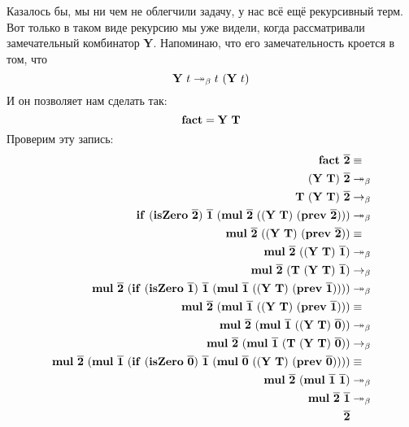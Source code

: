 \documentclass[lambda.tex]{subfiles}
\begin{document}
Казалось бы, мы ни чем не облегчили задачу, у нас всё ещё рекурсивный терм.
Вот только в таком виде рекурсию мы уже видели, когда рассматривали замечательный комбинатор \textbf{Y}.
Напоминаю, что его замечательность кроется в том, что
\[\text{\textbf{Y}}\ t \twoheadrightarrow_\beta t\ (\text{\textbf{Y}}\ t)\]
И он позволяет нам сделать так:
\[\text{\textbf{fact}} = \text{\textbf{Y}}\ \text{\textbf{T}}\]
Проверим эту запись:
\begin{align*}
	\mmterm{fact}\ \mmchurchn{2} &\equiv\\
	(\mmterm{Y}\ \mmterm{T})\ \mmchurchn{2} &\rbm\\
	\mmterm{T}\ (\mmterm{Y}\ \mmterm{T})\ \mmchurchn{2} &\rb\\
	\mmif\ (\mmterm{isZero}\ \mmchurchn{2})\ \mmchurchn{1}\ (\mmterm{mul}\ \mmchurchn{2}\ ((\mmterm{Y}\ \mmterm{T})\ (\mmterm{prev}\ \mmchurchn{2}))) &\rbm\\
	\mmterm{mul}\ \mmchurchn{2}\ ((\mmterm{Y}\ \mmterm{T})\ (\mmterm{prev}\ \mmchurchn{2})) &\equiv\\
	\mmterm{mul}\ \mmchurchn{2}\ ((\mmterm{Y}\ \mmterm{T})\ \mmchurchn{1}) &\rbm\\
	\mmterm{mul}\ \mmchurchn{2}\ (\mmterm{T}\ (\mmterm{Y}\ \mmterm{T})\ \mmchurchn{1}) &\rb\\
	\mmterm{mul}\ \mmchurchn{2}\ (\mmif\ (\mmterm{isZero}\ \mmchurchn{1})\ \mmchurchn{1}\ (\mmterm{mul}\ \mmchurchn{1}\ ((\mmterm{Y}\ \mmterm{T})\ (\mmterm{prev}\ \mmchurchn{1})))) &\rbm\\
	\mmterm{mul}\ \mmchurchn{2}\ (\mmterm{mul}\ \mmchurchn{1}\ ((\mmterm{Y}\ \mmterm{T})\ (\mmterm{prev}\ \mmchurchn{1}))) &\equiv\\
	\mmterm{mul}\ \mmchurchn{2}\ (\mmterm{mul}\ \mmchurchn{1}\ ((\mmterm{Y}\ \mmterm{T})\ \mmchurchn{0})) &\rbm\\
	\mmterm{mul}\ \mmchurchn{2}\ (\mmterm{mul}\ \mmchurchn{1}\ (\mmterm{T}\ (\mmterm{Y}\ \mmterm{T})\ \mmchurchn{0})) &\rb\\
	\mmterm{mul}\ \mmchurchn{2}\ (\mmterm{mul}\ \mmchurchn{1}\ (\mmif\ (\mmterm{isZero}\ \mmchurchn{0})\ \mmchurchn{1}\ (\mmterm{mul}\ \mmchurchn{0}\ ((\mmterm{Y}\ \mmterm{T})\ (\mmterm{prev}\ \mmchurchn{0})))) &\equiv\\
	\mmterm{mul}\ \mmchurchn{2}\ (\mmterm{mul}\ \mmchurchn{1}\ \mmchurchn{1}) &\rbm\\
	\mmterm{mul}\ \mmchurchn{2}\ \mmchurchn{1} &\rbm\\
	\mmchurchn{2}
\end{align*}
\end{document}
